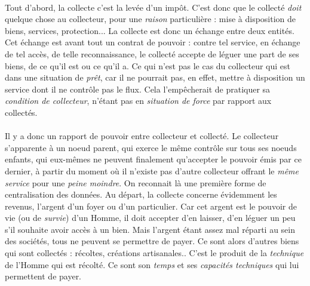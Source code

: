 \paragraph{} Tout d'abord, la collecte c'est la levée d'un impôt. C'est donc que le collecté \emph{doit}
quelque chose au collecteur, pour une \emph{raison} particulière : mise à disposition de biens, services,
protection... La collecte est donc un échange entre deux entités. Cet échange est avant tout un contrat de
pouvoir : contre tel service, en échange de tel accès, de telle reconnaissance, le collecté accepte de
léguer une part de ses biens, de ce qu'il est ou ce qu'il a. Ce qui n'est pas le cas du collecteur qui est
dans une situation de \emph{prêt}, car il ne pourrait pas, en effet, mettre à disposition un service dont
il ne contrôle pas le flux. Cela l'empêcherait de pratiquer sa \emph{condition de collecteur}, n'étant pas en
\emph{situation de force} par rapport aux collectés.

\paragraph{} Il y a donc un rapport de pouvoir entre collecteur et collecté. Le collecteur s'apparente à un noeud
parent, qui exerce le même contrôle sur tous ses noeuds enfants, qui eux-mêmes ne peuvent finalement qu'accepter
le pouvoir émis par ce dernier, à partir du moment où il n'existe pas d'autre collecteur offrant le \emph{même
service} pour une \emph{peine moindre}. On reconnait là une première forme de centralisation des données.
Au départ, la collecte concerne évidemment les revenus, l'argent d'un foyer ou d'un particulier. Car cet
argent est le pouvoir de vie (ou de \emph{survie}) d'un Homme, il doit accepter d'en laisser, d'en léguer un peu
s'il souhaite avoir accès à un bien. Mais l'argent étant assez mal réparti au sein des sociétés, tous ne peuvent se
permettre de payer. Ce sont alors d'autres biens qui sont collectés : récoltes, créations artisanales.. C'est le
produit de la \emph{technique} de l'Homme qui est récolté. Ce sont son \emph{temps} et ses \emph{capacités techniques}
qui lui permettent de payer.

